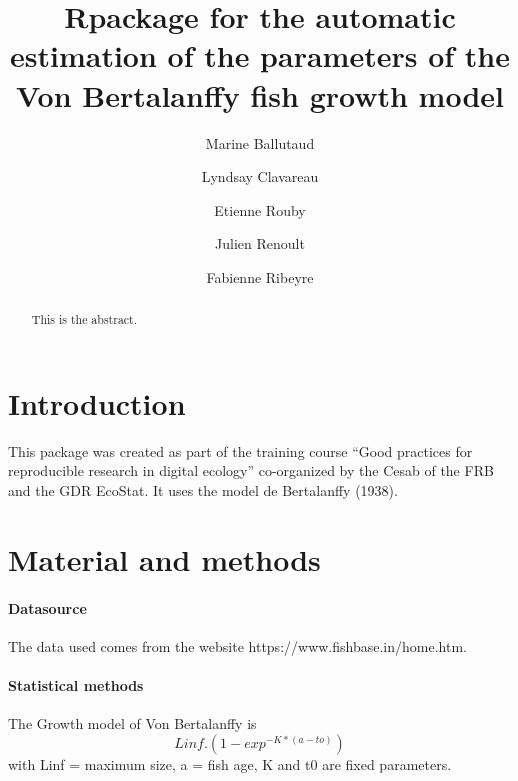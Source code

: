 \documentclass[]{elsarticle} %
\begin{document}
\begin{frontmatter}

  \title{Rpackage for the automatic estimation of the parameters of the Von
Bertalanffy fish growth model}
    \author[Université de Lille]{Marine Ballutaud}
    \author[IFREMER]{Lyndsay Clavareau}
    \author[Observatoire Pelagis]{Etienne Rouby}
    \author[Centre d'Ecologie Fonctionnelle et Evolutive]{Julien Renoult}
    \author[Cirad]{Fabienne Ribeyre}
      \address[Université de Lille]{Department, Street, City, State, Zip}
  
  \begin{abstract}
  This is the abstract.
  \end{abstract}
  
 \end{frontmatter}

\section{Introduction}\label{introduction}

This package was created as part of the training course ``Good practices
for reproducible research in digital ecology'' co-organized by the Cesab
of the FRB and the GDR EcoStat. It uses the model de Bertalanffy (1938).

\section{Material and methods}\label{material-and-methods}

\paragraph{Datasource}\label{datasource}

The data used comes from the website https://www.fishbase.in/home.htm.

\paragraph{Statistical methods}\label{statistical-methods}

The Growth model of Von Bertalanffy is \[Linf.(1-exp^{-K*(a-to)})\] with
Linf = maximum size, a = fish age, K and t0 are fixed parameters.
\end{document}
